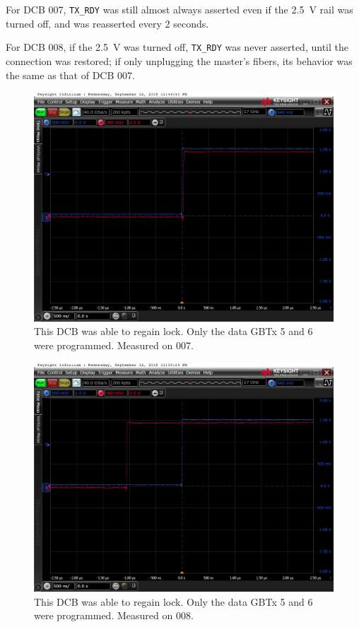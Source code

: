 \documentclass[11pt,letterpaper]{refart}
\begin{document}
For DCB 007, \texttt{TX\_RDY} was still almost always asserted even if the
\SI{2.5}{\volt} rail was turned off, and was reasserted every 2 seconds.

For DCB 008, if the \SI{2.5}{\volt} was turned off, \texttt{TX\_RDY} was never
asserted, until the connection was restored; if only unplugging the master's
fibers, its behavior was the same as that of DCB 007.

\begin{figure}[ht]
    \centering
    \includegraphics[width=0.8\linewidth]
        {./res/voltage_transient/txrdy.png}
    \caption[\texttt{TX\_RDY} signal on regain of lock, almost simutaneously]{
        This DCB was able to regain lock.
        Only the data GBTx 5 and 6 were programmed.
        Measured on 007.
    }
\end{figure}

\begin{figure}[ht]
    \centering
    \includegraphics[width=0.8\linewidth]
        {./res/voltage_transient/txrdy_recoverable.png}
    \caption[\texttt{TX\_RDY} signal on regain of lock, larger temperal
            separation]{
        This DCB was able to regain lock.
        Only the data GBTx 5 and 6 were programmed.
        Measured on 008.
    }
\end{figure}
\end{document}
